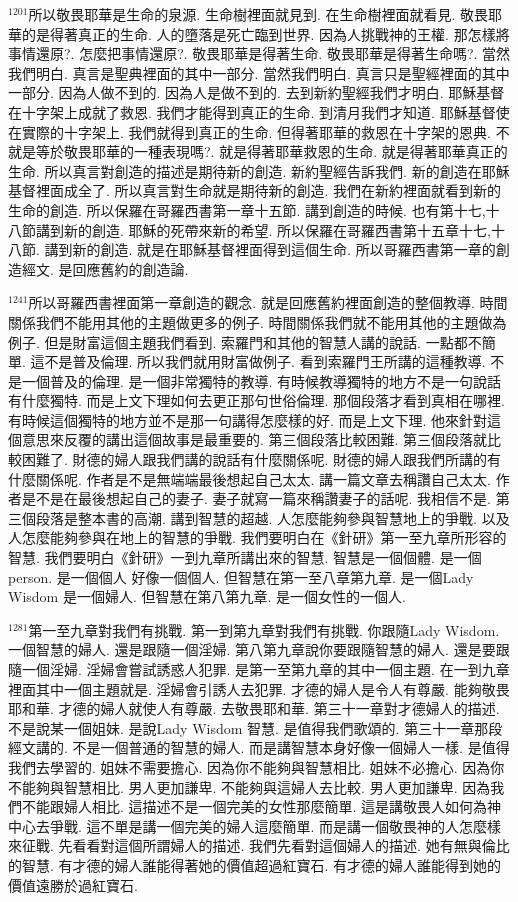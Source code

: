 \documentclass{book}
\begin{document}
$^{1201}$所以敬畏耶華是生命的泉源.
生命樹裡面就見到.
在生命樹裡面就看見.
敬畏耶華的是得著真正的生命.
人的墮落是死亡臨到世界.
因為人挑戰神的王權.
那怎樣將事情還原?.
怎麼把事情還原?.
敬畏耶華是得著生命.
敬畏耶華是得著生命嗎?.
當然我們明白.
真言是聖典裡面的其中一部分.
當然我們明白.
真言只是聖經裡面的其中一部分.
因為人做不到的.
因為人是做不到的.
去到新約聖經我們才明白.
耶穌基督在十字架上成就了救恩.
我們才能得到真正的生命.
到清月我們才知道.
耶穌基督使在實際的十字架上.
我們就得到真正的生命.
但得著耶華的救恩在十字架的恩典.
不就是等於敬畏耶華的一種表現嗎?.
就是得著耶華救恩的生命.
就是得著耶華真正的生命.
所以真言對創造的描述是期待新的創造.
新約聖經告訴我們.
新的創造在耶穌基督裡面成全了.
所以真言對生命就是期待新的創造.
我們在新約裡面就看到新的生命的創造.
所以保羅在哥羅西書第一章十五節.
講到創造的時候.
也有第十七,十八節講到新的創造.
耶穌的死帶來新的希望.
所以保羅在哥羅西書第十五章十七,十八節.
講到新的創造.
就是在耶穌基督裡面得到這個生命.
所以哥羅西書第一章的創造經文.
是回應舊約的創造論.

$^{1241}$所以哥羅西書裡面第一章創造的觀念.
就是回應舊約裡面創造的整個教導.
時間關係我們不能用其他的主題做更多的例子.
時間關係我們就不能用其他的主題做為例子.
但是財富這個主題我們看到.
索羅門和其他的智慧人講的說話.
一點都不簡單.
這不是普及倫理.
所以我們就用財富做例子.
看到索羅門王所講的這種教導.
不是一個普及的倫理.
是一個非常獨特的教導.
有時候教導獨特的地方不是一句說話有什麼獨特.
而是上文下理如何去更正那句世俗倫理.
那個段落才看到真相在哪裡.
有時候這個獨特的地方並不是那一句講得怎麼樣的好.
而是上文下理.
他來針對這個意思來反覆的講出這個故事是最重要的.
第三個段落比較困難.
第三個段落就比較困難了.
財德的婦人跟我們講的說話有什麼關係呢.
財德的婦人跟我們所講的有什麼關係呢.
作者是不是無端端最後想起自己太太.
講一篇文章去稱讚自己太太.
作者是不是在最後想起自己的妻子.
妻子就寫一篇來稱讚妻子的話呢.
我相信不是.
第三個段落是整本書的高潮.
講到智慧的超越.
人怎麼能夠參與智慧地上的爭戰.
以及人怎麼能夠參與在地上的智慧的爭戰.
我們要明白在《針研》第一至九章所形容的智慧.
我們要明白《針研》一到九章所講出來的智慧.
智慧是一個個體.
是一個person.
是一個個人 好像一個個人.
但智慧在第一至八章第九章.
是一個Lady Wisdom 是一個婦人.
但智慧在第八第九章.
是一個女性的一個人.

$^{1281}$第一至九章對我們有挑戰.
第一到第九章對我們有挑戰.
你跟隨Lady Wisdom.
一個智慧的婦人.
還是跟隨一個淫婦.
第八第九章說你要跟隨智慧的婦人.
還是要跟隨一個淫婦.
淫婦會嘗試誘惑人犯罪.
是第一至第九章的其中一個主題.
在一到九章裡面其中一個主題就是.
淫婦會引誘人去犯罪.
才德的婦人是令人有尊嚴.
能夠敬畏耶和華.
才德的婦人就使人有尊嚴.
去敬畏耶和華.
第三十一章對才德婦人的描述.
不是說某一個姐妹.
是說Lady Wisdom 智慧.
是值得我們歌頌的.
第三十一章那段經文講的.
不是一個普通的智慧的婦人.
而是講智慧本身好像一個婦人一樣.
是值得我們去學習的.
姐妹不需要擔心.
因為你不能夠與智慧相比.
姐妹不必擔心.
因為你不能夠與智慧相比.
男人更加謙卑.
不能夠與這婦人去比較.
男人更加謙卑.
因為我們不能跟婦人相比.
這描述不是一個完美的女性那麼簡單.
這是講敬畏人如何為神中心去爭戰.
這不單是講一個完美的婦人這麼簡單.
而是講一個敬畏神的人怎麼樣來征戰.
先看看對這個所謂婦人的描述.
我們先看對這個婦人的描述.
她有無與倫比的智慧.
有才德的婦人誰能得著她的價值超過紅寶石.
有才德的婦人誰能得到她的價值遠勝於過紅寶石.
\end{document}

